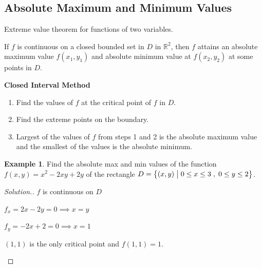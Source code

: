 \documentclass[11pt,a4paper]{article}
\theoremstyle{definition}
\newtheorem{exa}[thm]{Example}
\newenvironment{solution}
  {\renewcommand{\qedsymbol}{}\begin{proof}[\textit{Solution}.]}
  {\end{proof}}
\newcommand{\subhead}[1]{%
  \par\medskip\noindent\textbf{#1}\par\nobreak\smallskip}
\begin{document}
{\color[wave]{485}\subsection{Absolute Maximum and Minimum Values}}
Extreme value theorem for functions of two variables.


If $f$ is continuous on a closed bounded set in $D$ in $\mathbb{R}^2$, then $f$ attains an absolute maximum value $f(x_1,y_1)$ and absolute minimum value at $f(x_2,y_2)$ at some points in $D$.


\subhead{Closed Interval Method}
\begin{enumerate}
\item Find the values of  $f$ at the critical point of $f$ in $D$.

\item Find the extreme points on the boundary.

\item Largest of the values of $f$ from steps 1 and 2 is the absolute maximum value and the smallest of the values is the absolute minimum.
\end{enumerate}

\begin{exa}


Find the absolute max and min values of the function $f(x,y) = x^2 - 2xy + 2y$ of the  rectangle $D = \big\{(x,y)\hspace{0.1cm} \big| \hspace{0.1cm} 0\leq x \leq 3\hspace{0.1cm} , \hspace{0.1cm} 0 \leq y \leq 2 \big\}$.
\end{exa}


\begin{solution}


$f$ is continuous on $D$


$f_x = 2x -2y = 0 \implies x = y$


$f_y = -2x + 2 = 0 \implies x = 1$


$(1,1)$ is the only critical point and $f(1,1) = 1$.


\begin{figure}[H]
\centering
{}
\end{figure}
\end{solution}
\end{document}
